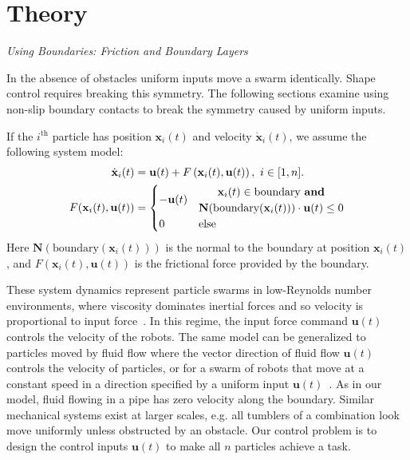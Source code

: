 \section{Theory}
\label{sec:theory}

\emph{Using Boundaries: Friction and Boundary Layers}\label{subsec:WallFriction}

In the absence of obstacles uniform inputs move a swarm identically.  
Shape control requires breaking this symmetry. 
The following sections examine using non-slip boundary contacts to break the symmetry caused by uniform inputs.  
 
 If the $i^{\textrm{th}}$ particle has position $\mathbf{x}_i(t)$ and velocity $\dot{\mathbf{x}}_i(t)$,  we assume the following system model:
 \begin{align}\label{eq:swarmDynamicsAndFric} 
\dot{\mathbf{x}}_i(t)
 &=
 \mathbf{u}(t)
 +F \left( \mathbf{x}_i(t), \mathbf{u}(t) \right), ~i \in [1,n].\\
 F(\mathbf{x}_i(t), \mathbf{u}(t)) &= \begin{cases}
  - \mathbf{u}(t) &\begin{matrix} \mathbf{x}_i(t) \in  \textrm{boundary \textbf{and}}\\
\mathbf{N}(\textrm{boundary$(\mathbf{x}_i(t))$})\cdot   \mathbf{u}(t) \le 0 \end{matrix}
 \\
 0 & \textrm{else} 
 \end{cases}\nonumber
 \end{align}
 Here $\mathbf{N}(\textrm{boundary$(\mathbf{x}_i(t))$})$ is the normal to the boundary at position $\mathbf{x}_i(t)$, and
 $F(\mathbf{x}_i(t), \mathbf{u}(t)) $ is the frictional force provided by the boundary.
 
 
These system dynamics represent particle swarms in low-Reynolds number environments, where viscosity dominates inertial forces and so velocity is proportional to input force~\cite{Purcell1977}. 
 In this regime, the input force command $\mathbf{u}(t)$ controls the velocity of the robots.  
  The same model can be generalized to particles moved by fluid flow where the vector direction of fluid flow $\mathbf{u}(t)$ controls the velocity of particles, or for a swarm of robots that move at a constant speed in a direction specified by a uniform input $\mathbf{u}(t)$~\cite{Rubenstein2012}.
  As in our model, fluid flowing in a pipe has zero velocity along the boundary. Similar mechanical systems exist at larger scales, e.g. all tumblers of a combination look move uniformly unless obstructed by an obstacle.
 Our control problem is to design the control inputs $\mathbf{u}(t)$ to make all $n$ particles achieve a task.